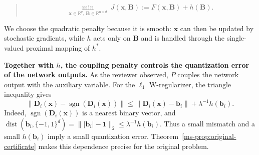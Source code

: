 \documentclass[11pt]{article}
\newcommand{\mref}[1]{\ref*{ms-#1}}
\newcommand{\RR}{\mathbb{R}}
\newcommand{\bB}{\bm{B}}
\newcommand{\bD}{\bm{D}}
\newcommand{\bx}{\bm{x}}
\newcommand{\bb}{\bm{b}}
\newenvironment{bluequote}{\begin{quote}\normalfont\upshape\color{blue}}{\end{quote}}
\let\reviewitem\item
\newenvironment{qalist}{\begin{description}[leftmargin=0pt,labelindent=0pt,itemsep=0.8em,parsep=0.5em,font=\normalfont\upshape\bfseries]}{\end{description}}
\begin{document}
\begin{qalist}
\begin{enumerate}[label={[\roman*]},before=\let\item\reviewitem]
\begin{bluequote}
\[
\min_{\bx\in\RR^{q},\,\bB\in\RR^{n\times d}}\ J(\bx,\bB):=F(\bx,\bB)+h(\bB).\tag{P}
\]
\end{bluequote}
We choose the quadratic penalty because it is smooth: $\bx$ can then be updated by stochastic gradients, while $h$ acts only on $\bB$ and is handled through the single-valued proximal mapping of $h^*$.
\item \textbf{Together with $h$, the coupling penalty controls the quantization error of the network outputs.} As the reviewer observed, $P$ couples the network output with the auxiliary variable. For the $\ell_1$ W-regularizer, the triangle inequality gives
\[
\big\|\bD_i(\bx)-\operatorname{sgn}(\bD_i(\bx))\big\|\le\|\bD_i(\bx)-\bb_i\|+\lambda^{-1}h(\bb_i).
\]
Indeed, $\operatorname{sgn}(\bD_i(\bx))$ is a nearest binary vector, and $\operatorname{dist}(\bb_i,\{-1,1\}^d)=\||\bb_i|-\mathbf{1}\|_2\le\lambda^{-1}h(\bb_i)$. Thus a small mismatch and a small $h(\bb_i)$ imply a small quantization error. Theorem~\mref{prop:original-certificate} makes this dependence precise for the original problem.
\end{enumerate}

\end{qalist}


\medskip
{}
\end{document}
